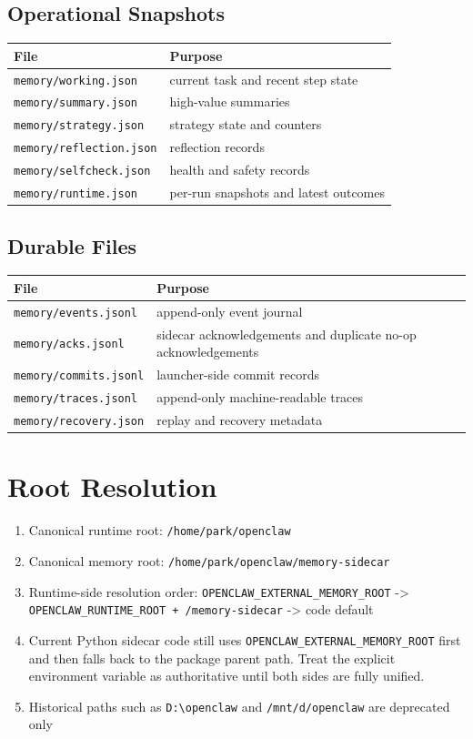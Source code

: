 \documentclass[11pt,a4paper,oneside,openany]{book}
\begin{document}
\section{Operational Snapshots}
\begin{longtable}{p{}p{}}
\toprule
\textbf{File} & \textbf{Purpose}\\
\midrule
\endhead
\texttt{memory/working.json} & current task and recent step state\\
\texttt{memory/summary.json} & high-value summaries\\
\texttt{memory/strategy.json} & strategy state and counters\\
\texttt{memory/reflection.json} & reflection records\\
\texttt{memory/selfcheck.json} & health and safety records\\
\texttt{memory/runtime.json} & per-run snapshots and latest outcomes\\
\bottomrule
\end{longtable}
\section{Durable Files}
\begin{longtable}{p{}p{}}
\toprule
\textbf{File} & \textbf{Purpose}\\
\midrule
\endhead
\texttt{memory/events.jsonl} & append-only event journal\\
\texttt{memory/acks.jsonl} & sidecar acknowledgements and duplicate no-op acknowledgements\\
\texttt{memory/commits.jsonl} & launcher-side commit records\\
\texttt{memory/traces.jsonl} & append-only machine-readable traces\\
\texttt{memory/recovery.json} & replay and recovery metadata\\
\bottomrule
\end{longtable}
\chapter{Root Resolution}
\begin{enumerate}
  \item Canonical runtime root: \texttt{/home/park/openclaw}
  \item Canonical memory root: \texttt{/home/park/openclaw/memory-sidecar}
  \item Runtime-side resolution order: \texttt{OPENCLAW\_EXTERNAL\_MEMORY\_ROOT} -> \texttt{OPENCLAW\_RUNTIME\_ROOT + /memory-sidecar} -> code default
  \item Current Python sidecar code still uses \texttt{OPENCLAW\_EXTERNAL\_MEMORY\_ROOT} first and then falls back to the package parent path. Treat the explicit environment variable as authoritative until both sides are fully unified.
  \item Historical paths such as \texttt{D:\textbackslash openclaw} and \texttt{/mnt/d/openclaw} are deprecated only
\end{enumerate}
\end{document}
